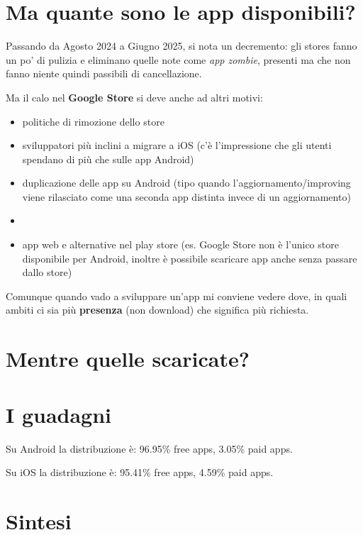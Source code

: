 \section{Ma quante sono le app disponibili?}
\par Passando da Agosto 2024 a Giugno 2025, si nota un decremento: gli stores fanno un po' di pulizia e eliminano quelle note come \textit{app zombie}, presenti ma che non fanno niente quindi passibili di cancellazione.
\par Ma il calo nel \textbf{Google Store} si deve anche ad altri motivi:
\begin{itemize}
    \item politiche di rimozione dello store
    \item sviluppatori più inclini a migrare a iOS (c'è l'impressione che gli utenti spendano di più che sulle app Android)
    \item duplicazione delle app su Android (tipo quando l'aggiornamento/improving viene rilasciato come una seconda app distinta invece di un aggiornamento)
    \item 
    \item app web e alternative nel play store (es. Google Store non è l'unico store disponibile per Android, inoltre è possibile scaricare app anche senza passare dallo store)
\end{itemize}

\par Comunque quando vado a sviluppare un'app mi conviene vedere dove, in quali ambiti ci sia più \textbf{presenza} (non download) che significa più richiesta.

\section{Mentre quelle scaricate?}

\section{I guadagni}
\par Su Android la distribuzione è: 96.95\% free apps, 3.05\% paid apps.
\par Su iOS la distribuzione è: 95.41\% free apps, 4.59\% paid apps.

\section{Sintesi}
